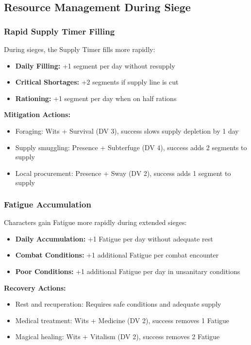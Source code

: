 \documentclass[11pt,letterpaper]{article}
\begin{document}
\subsection{Resource Management During Siege}

\subsubsection{Rapid Supply Timer Filling}

During sieges, the Supply Timer fills more rapidly:
\begin{itemize}[leftmargin=*]
    \item \textbf{Daily Filling:} +1 segment per day without resupply
    \item \textbf{Critical Shortages:} +2 segments if supply line is cut
    \item \textbf{Rationing:} +1 segment per day when on half rations
\end{itemize}

\textbf{Mitigation Actions:}
\begin{itemize}[leftmargin=*]
    \item Foraging: Wits + Survival (DV 3), success slows supply depletion by 1 day
    \item Supply smuggling: Presence + Subterfuge (DV 4), success adds 2 segments to supply
    \item Local procurement: Presence + Sway (DV 2), success adds 1 segment to supply
\end{itemize}

\subsubsection{Fatigue Accumulation}

Characters gain Fatigue more rapidly during extended sieges:
\begin{itemize}[leftmargin=*]
    \item \textbf{Daily Accumulation:} +1 Fatigue per day without adequate rest
    \item \textbf{Combat Conditions:} +1 additional Fatigue per combat encounter
    \item \textbf{Poor Conditions:} +1 additional Fatigue per day in unsanitary conditions
\end{itemize}

\textbf{Recovery Actions:}
\begin{itemize}[leftmargin=*]
    \item Rest and recuperation: Requires safe conditions and adequate supply
    \item Medical treatment: Wits + Medicine (DV 2), success removes 1 Fatigue
    \item Magical healing: Wits + Vitalism (DV 2), success removes 2 Fatigue
\end{itemize}
\end{document}
